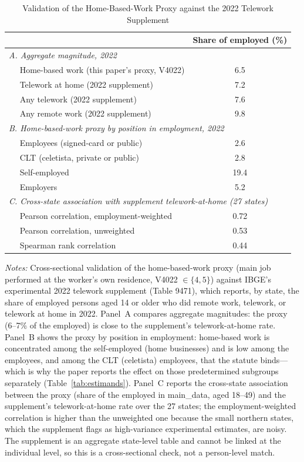 \begin{table}[H]\centering
\caption{Validation of the Home-Based-Work Proxy against the 2022 Telework Supplement}
\label{tab:proxy_validation}\small
\begin{tabular}{lc}
\toprule
 & Share of employed (\%) \\
\midrule
\multicolumn{2}{l}{\textit{A. Aggregate magnitude, 2022}} \\
$\quad$ Home-based work (this paper's proxy, V4022) & 6.5 \\
$\quad$ Telework at home (2022 supplement) & 7.2 \\
$\quad$ Any telework (2022 supplement) & 7.6 \\
$\quad$ Any remote work (2022 supplement) & 9.8 \\
\midrule
\multicolumn{2}{l}{\textit{B. Home-based-work proxy by position in employment, 2022}} \\
$\quad$ Employees (signed-card or public) & 2.6 \\
$\quad$ CLT (celetista, private or public) & 2.8 \\
$\quad$ Self-employed & 19.4 \\
$\quad$ Employers & 5.2 \\
\midrule
\multicolumn{2}{l}{\textit{C. Cross-state association with supplement telework-at-home (27 states)}} \\
$\quad$ Pearson correlation, employment-weighted & 0.72 \\
$\quad$ Pearson correlation, unweighted & 0.53 \\
$\quad$ Spearman rank correlation & 0.44 \\
\bottomrule\end{tabular}
\par\vspace{3pt}\footnotesize\raggedright \textit{Notes:} Cross-sectional validation of the home-based-work proxy (main job performed at the worker's own residence, V4022 $\in\{4,5\}$) against IBGE's experimental 2022 telework supplement (Table 9471), which reports, by state, the share of employed persons aged 14 or older who did remote work, telework, or telework at home in 2022. Panel~A compares aggregate magnitudes: the proxy (6--7\% of the employed) is close to the supplement's telework-at-home rate. Panel~B shows the proxy by position in employment: home-based work is concentrated among the self-employed (home businesses) and is low among the employees, and among the CLT (celetista) employees, that the statute binds---which is why the paper reports the effect on those predetermined subgroups separately (Table~\ref{tab:estimands}). Panel~C reports the cross-state association between the proxy (share of the employed in main\_data, aged 18--49) and the supplement's telework-at-home rate over the 27 states; the employment-weighted correlation is higher than the unweighted one because the small northern states, which the supplement flags as high-variance experimental estimates, are noisy. The supplement is an aggregate state-level table and cannot be linked at the individual level, so this is a cross-sectional check, not a person-level match.
\end{table}
